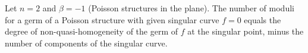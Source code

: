 Let $n = 2$ and $\beta = -1$ (Poisson structures in the plane). The number of moduli for a germ of a Poisson structure with given singular curve $f = 0$ equals the degree of non-quasi-homogeneity of the germ of $f$ at the singular point, minus the number of components of the singular curve.
